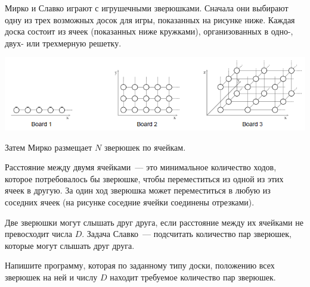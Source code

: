 Мирко и Славко играют с игрушечными зверюшками. Сначала они выбирают одну из трех возможных
досок для игры, показанных на рисунке ниже. Каждая доска состоит из ячеек (показанных ниже
кружками), организованных в одно-, двух- или трехмерную решетку. 

\includegraphics[scale=0.9]{pairs.png}

Затем Мирко размещает $N$ зверюшек по ячейкам. 

Расстояние между двумя ячейками~--- это минимальное количество ходов, которое потребовалось бы
зверюшке, чтобы переместиться из одной из этих ячеек в другую. За один ход зверюшка может
переместиться в любую из соседних ячеек (на рисунке соседние ячейки соединены отрезками).

Две зверюшки могут слышать друг друга, если расстояние между их ячейками не превосходит числа $D$.
Задача Славко~--- подсчитать количество пар зверюшек, которые могут слышать друг друга. 

Напишите программу, которая по заданному типу доски, положению всех зверюшек на ней и числу $D$ находит требуемое количество пар зверюшек. 